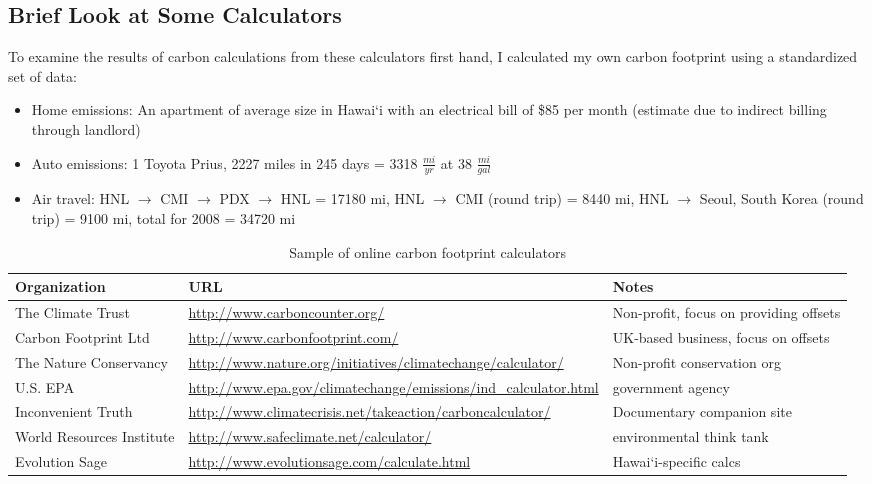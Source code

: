 \subsection{Brief Look at Some Calculators}

To examine the results of carbon calculations from these calculators first hand, I calculated my own carbon footprint using a standardized set of data:
\begin{itemize}
	\item Home emissions: An apartment of average size in Hawai`i with an electrical bill of \$85 per month (estimate due to indirect billing through landlord)
	\item Auto emissions: 1 Toyota Prius, 2227 miles in 245 days = 3318 $\frac{mi}{yr}$ at 38 $\frac{mi}{gal}$
	\item Air travel: HNL $\rightarrow$ CMI $\rightarrow$ PDX $\rightarrow$ HNL = 17180 mi, HNL $\rightarrow$ CMI (round trip) = 8440 mi, HNL $\rightarrow$ Seoul, South Korea (round trip) = 9100 mi, total for 2008 = 34720 mi
\end{itemize}

\begin{table}[htbp]
	\begin{center}
		\caption{Sample of online carbon footprint calculators}
		\label{tab:carbon-footprint-calculators}
		\scriptsize

		\begin{tabular}{| l | p{7cm} | p{5cm} |}
			\hline
			Organization & URL & Notes \\ \hline
			The Climate Trust & \url{http://www.carboncounter.org/} & Non-profit, focus on providing offsets \\ \hline
	
			Carbon Footprint Ltd & \url{http://www.carbonfootprint.com/} & UK-based business, focus on offsets \\ \hline
	
			The Nature Conservancy & \url{http://www.nature.org/initiatives/climatechange/calculator/} & Non-profit conservation org \\ \hline
	
			U.S. EPA & \url{http://www.epa.gov/climatechange/emissions/ind_calculator.html} & government agency \\ \hline

			Inconvenient Truth & \url{http://www.climatecrisis.net/takeaction/carboncalculator/} & Documentary companion site \\ \hline

			World Resources Institute & \url{http://www.safeclimate.net/calculator/} & environmental think tank \\ \hline

			Evolution Sage & \url{http://www.evolutionsage.com/calculate.html} & Hawai`i-specific calcs \\ \hline
		\end{tabular}
	\end{center}
\end{table}

